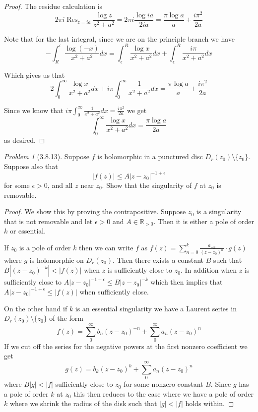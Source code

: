 \documentclass[10pt]{article}
\newcommand{\sk}{\vskip 10mm}
\newcommand{\bb}[1]{\mathbb{#1}}
\DeclareMathOperator{\Res}{Res}
\theoremstyle{remark}
\newtheorem{problem}{Problem}
\theoremstyle{remark}
\begin{document}
\begin{proof}
  The residue calculation is
  \[
    2\pi i\Res_{z=ia}\frac{\log z}{z^2+a^2}= 2\pi i\frac{\log ia}{2ia} = \frac{\pi\log a}{a}+\frac{i\pi^2}{2a}
  \]

  Note that for the last integral, since we are on the principle branch we have
  \[
    -\int_{R}^{\epsilon}\frac{\log (-x)}{x^2+a^2}dx =\int_\epsilon^R\frac{\log x}{x^2+a^2}dx+\int_\epsilon^R\frac{i\pi}{x^2+a^2}dx
  \]
  
  Which gives us that
  \[
    2\int_0^\infty\frac{\log x}{x^2+a^2}dx+i\pi\int_0^\infty\frac{1}{x^2+a^2}dx = \frac{\pi\log a}{a}+\frac{i\pi^2}{2a}
  \]

  Since we know that $i\pi\int_0^\infty\frac{1}{x^2+a^2}dx = \frac{i\pi^2}{2a}$ we get
  \[
    \int_0^\infty\frac{\log x}{x^2+a^2}dx=\frac{\pi\log a}{2a}
  \]
  as desired.
\end{proof}

\sk

\begin{problem}[3.8.13]
  Suppose $f$ is holomorphic in a punctured disc $D_r(z_0)\setminus\{z_0\}$.
  Suppose also that
  \[
    |f(z)|\leq A|z-z_0|^{-1+\epsilon}
  \]
  for some $\epsilon>0$, and all $z$ near $z_0$. Show that the singularity
  of $f$ at $z_0$ is removable.
\end{problem}

\begin{proof}
  We show this by proving the contrapositive. Suppose $z_0$ is a singularity
  that is not removable and let $\epsilon>0$ and $A\in\bb{R}_{>0}$.
  Then it is either a pole of order $k$ or essential.

  If $z_0$ is a pole of order $k$ then we can write $f$ as
  $f(z)=\sum_{n=0}^k\frac{a_{-n}}{(z-z_0)^{n}}\cdot g(z)$ where $g$ is holomorphic on
  $D_r(z_0)$. Then there exists a constant $B$ such that $B|(z-z_0)^{-k}|<|f(z)|$
  when $z$ is sufficiently close to $z_0$. In addition when $z$ is sufficiently
  close to $A|z-z_0|^{-1+\epsilon}\leq B|z-z_0|^{-k}$ which then implies that
  $A|z-z_0|^{-1+\epsilon}\leq|f(z)|$ when sufficiently close.

  On the other hand if $k$ is an essential singularity we have a Laurent
  series in $D_r(z_0)\setminus\{z_0\}$ of the form
  \[
    f(z)=\sum_0^\infty b_n(z-z_0)^{-n} +\sum_0^\infty a_n(z-z_0)^n
  \]
  If we cut off the series for the negative powers at the first nonzero coefficient
  we get
  \[
    g(z)=b_k(z-z_0)^k+\sum_0^\infty a_n(z-z_0)^n
  \]
  where $B|g|<|f|$ sufficiently close to $z_0$ for some nonzero constant $B$. Since
  $g$ has a pole of order $k$ at $z_0$ this then reduces to the case where we have a
  pole of order $k$ where we shrink the radius of the disk such that $|g|<|f|$ holds within.
\end{proof}
\end{document}
